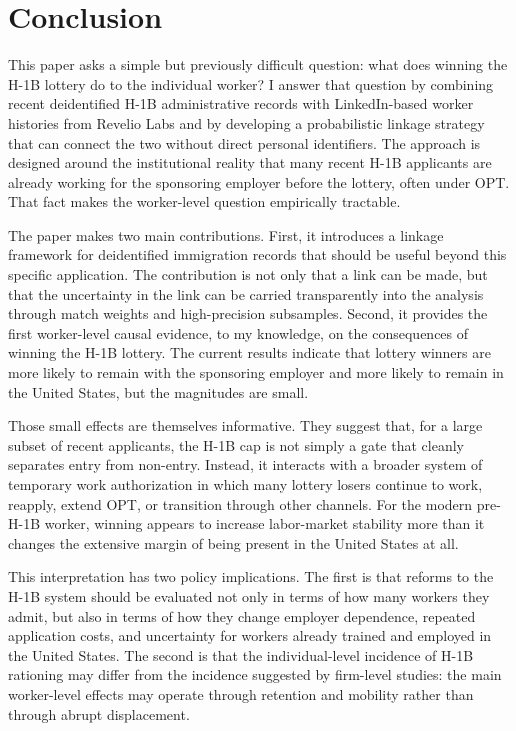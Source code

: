 \section{Conclusion}
\label{sec:conclusion}

This paper asks a simple but previously difficult question: what does winning the H-1B lottery do to the individual worker? I answer that question by combining recent deidentified H-1B administrative records with LinkedIn-based worker histories from Revelio Labs and by developing a probabilistic linkage strategy that can connect the two without direct personal identifiers. The approach is designed around the institutional reality that many recent H-1B applicants are already working for the sponsoring employer before the lottery, often under OPT. That fact makes the worker-level question empirically tractable.

The paper makes two main contributions. First, it introduces a linkage framework for deidentified immigration records that should be useful beyond this specific application. The contribution is not only that a link can be made, but that the uncertainty in the link can be carried transparently into the analysis through match weights and high-precision subsamples. Second, it provides the first worker-level causal evidence, to my knowledge, on the consequences of winning the H-1B lottery. The current results indicate that lottery winners are more likely to remain with the sponsoring employer and more likely to remain in the United States, but the magnitudes are small.

Those small effects are themselves informative. They suggest that, for a large subset of recent applicants, the H-1B cap is not simply a gate that cleanly separates entry from non-entry. Instead, it interacts with a broader system of temporary work authorization in which many lottery losers continue to work, reapply, extend OPT, or transition through other channels. For the modern pre-H-1B worker, winning appears to increase labor-market stability more than it changes the extensive margin of being present in the United States at all.

This interpretation has two policy implications. The first is that reforms to the H-1B system should be evaluated not only in terms of how many workers they admit, but also in terms of how they change employer dependence, repeated application costs, and uncertainty for workers already trained and employed in the United States. The second is that the individual-level incidence of H-1B rationing may differ from the incidence suggested by firm-level studies: the main worker-level effects may operate through retention and mobility rather than through abrupt displacement.

